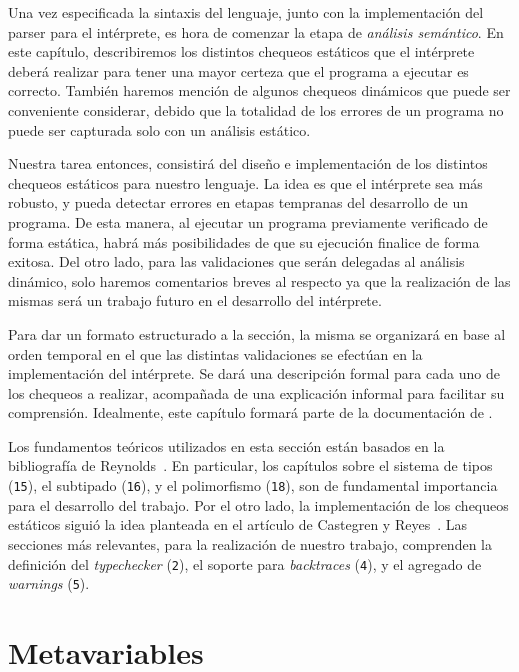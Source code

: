 Una vez especificada la sintaxis del lenguaje, junto con la implementación del parser para el intérprete, es hora de comenzar la etapa de \textit{análisis semántico}.
En este capítulo, describiremos los distintos chequeos estáticos que el intérprete deberá realizar para tener una mayor certeza que el programa a ejecutar es correcto.
También haremos mención de algunos chequeos dinámicos que puede ser conveniente considerar, debido que la totalidad de los errores de un programa no puede ser capturada solo con un análisis estático.

Nuestra tarea entonces, consistirá del diseño e implementación de los distintos chequeos estáticos para nuestro lenguaje.
La idea es que el intérprete sea más robusto, y pueda detectar errores en etapas tempranas del desarrollo de un programa.
De esta manera, al ejecutar un programa previamente verificado de forma estática, habrá más posibilidades de que su ejecución finalice de forma exitosa.
Del otro lado, para las validaciones que serán delegadas al análisis dinámico, solo haremos comentarios breves al respecto ya que la realización de las mismas será un trabajo futuro en el desarrollo del intérprete.

Para dar un formato estructurado a la sección, la misma se organizará en base al orden temporal en el que las distintas validaciones se efectúan en la implementación del intérprete.
Se dará una descripción formal para cada uno de los chequeos a realizar, acompañada de una explicación informal para facilitar su comprensión.
Idealmente, este capítulo formará parte de la documentación de \Lenguaje{}.

Los fundamentos teóricos utilizados en esta sección están basados en la bibliografía de Reynolds~\cite{Reynolds}.
En particular, los capítulos sobre el sistema de tipos (\texttt{15}), el subtipado (\texttt{16}), y el polimorfismo (\texttt{18}), son de fundamental importancia para el desarrollo del trabajo.
Por el otro lado, la implementación de los chequeos estáticos siguió la idea planteada en el artículo de Castegren y Reyes~\cite{MonadicTC}.
Las secciones más relevantes, para la realización de nuestro trabajo, comprenden la definición del \textit{typechecker} (\texttt{2}), el soporte para \textit{backtraces} (\texttt{4}), y el agregado de \textit{warnings} (\texttt{5}).

\section{Metavariables}

